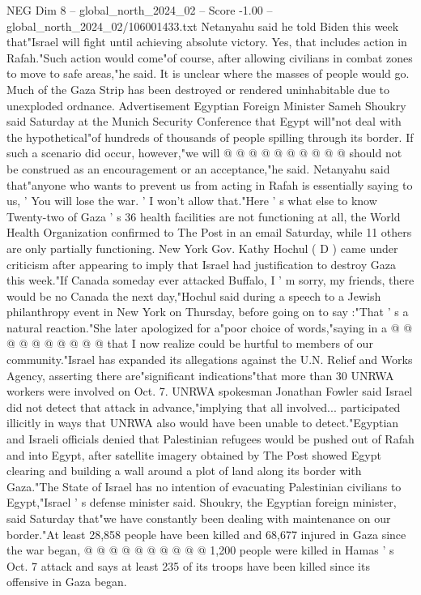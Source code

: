\begin{textsample}{NEG Dim 8 – global\_north\_2024\_02 – Score -1.00 – global\_north\_2024\_02/106001433.txt}
Netanyahu said he told Biden this week that"Israel will fight until achieving absolute victory.
Yes, that includes action in Rafah."Such action would come"of course, after allowing civilians in combat zones to move to safe areas,"he said.
It is unclear where the masses of people would go.
Much of the Gaza Strip has been destroyed or rendered uninhabitable due to unexploded ordnance.
Advertisement Egyptian Foreign Minister Sameh Shoukry said Saturday at the Munich Security Conference that Egypt will"not deal with the hypothetical"of hundreds of thousands of people spilling through its border.
If such a scenario did occur, however,"we will @ @ @ @ @ @ @ @ @ @ should not be construed as an encouragement or an acceptance,"he said.
Netanyahu said that"anyone who wants to prevent us from acting in Rafah is essentially saying to us, ' You will lose the war. ' I won't allow that."Here ' s what else to know Twenty-two of Gaza ' s 36 health facilities are not functioning at all, the World Health Organization confirmed to The Post in an email Saturday, while 11 others are only partially functioning.
New York Gov.
Kathy Hochul ( D ) came under criticism after appearing to imply that Israel had justification to destroy Gaza this week."If Canada someday ever attacked Buffalo, I ' m sorry, my friends, there would be no Canada the next day,"Hochul said during a speech to a Jewish philanthropy event in New York on Thursday, before going on to say :"That ' s a natural reaction."She later apologized for a"poor choice of words,"saying in a @ @ @ @ @ @ @ @ @ @ that I now realize could be hurtful to members of our community."Israel has expanded its allegations against the U.N.
Relief and Works Agency, asserting there are"significant indications"that more than 30 UNRWA workers were involved on Oct. 7.
UNRWA spokesman Jonathan Fowler said Israel did not detect that attack in advance,"implying that all involved... participated illicitly in ways that UNRWA also would have been unable to detect."Egyptian and Israeli officials denied that Palestinian refugees would be pushed out of Rafah and into Egypt, after satellite imagery obtained by The Post showed Egypt clearing and building a wall around a plot of land along its border with Gaza."The State of Israel has no intention of evacuating Palestinian civilians to Egypt,"Israel ' s defense minister said.
Shoukry, the Egyptian foreign minister, said Saturday that"we have constantly been dealing with maintenance on our border."At least 28,858 people have been killed and 68,677 injured in Gaza since the war began, @ @ @ @ @ @ @ @ @ @ 1,200 people were killed in Hamas ' s Oct. 7 attack and says at least 235 of its troops have been killed since its offensive in Gaza began.

\end{textsample}

